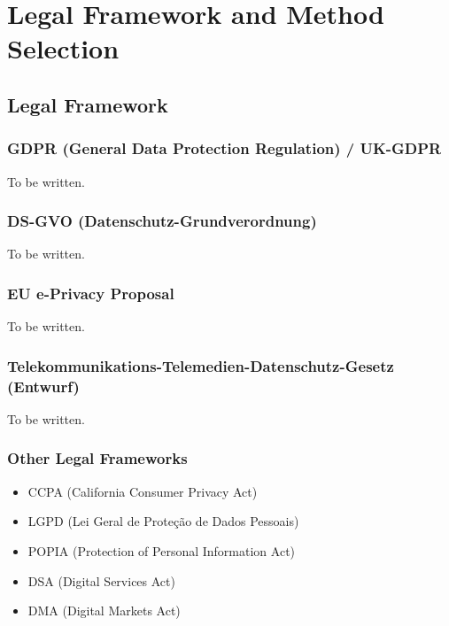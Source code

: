%
%

\pagebreak
\section{Legal Framework and Method Selection}

\onehalfspacing

\subsection{Legal Framework}

\subsubsection{GDPR (General Data Protection Regulation) / UK-GDPR}

To be written.

\subsubsection{DS-GVO (Datenschutz-Grundverordnung)}

To be written.

\subsubsection{EU e-Privacy Proposal}

To be written.

\subsubsection{Telekommunikations-Telemedien-Datenschutz-Gesetz (Entwurf)}

To be written.

\subsubsection{Other Legal Frameworks}

\begin{itemize}
 \item CCPA (California Consumer Privacy Act)
 \item LGPD (Lei Geral de Proteção de Dados Pessoais)
 \item POPIA (Protection of Personal Information Act)
 \item DSA (Digital Services Act)
 \item DMA (Digital Markets Act)
\end{itemize}

